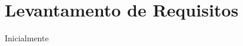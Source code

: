 \chapter{Levantamento de Requisitos}

Inicialmente

\begin{citacaoLonga}
  \blindtext
\end{citacaoLonga}

\blindtext
